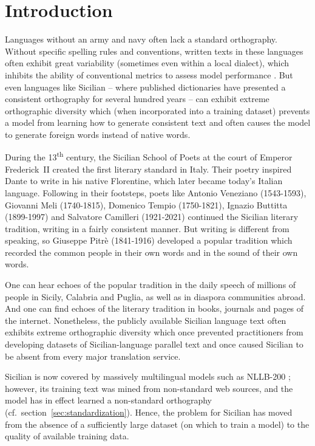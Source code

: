 \documentclass[11pt,a4paper]{article}
\begin{document}
\section{Introduction}
Languages without an army and navy often lack a standard orthography.
Without specific spelling rules and conventions, written texts in these languages
often exhibit great variability (sometimes even within a local dialect),
which inhibits the ability of conventional metrics to assess model performance
\citep{aepli2023benchmark}.
But even languages like Sicilian -- where published dictionaries have presented
a consistent orthography for several hundred years
\citep{pasqualino1785,mortillaro1876,nicotra1883,traina1868} --
can exhibit extreme orthographic diversity which
(when incorporated into a training dataset)
prevents a model from learning how to generate consistent text
and often causes the model to
generate foreign words instead of native words.

During the 13\textsuperscript{th} century,
the Sicilian School of Poets at the court of Emperor Frederick~II
created the first literary standard in Italy.  Their poetry
inspired Dante to write in his native Florentine, which later
became today's Italian language.
Following in their footsteps, poets like
Antonio Veneziano (1543-1593),
Giovanni Meli (1740-1815),
Domenico Tempio (1750-1821),
Ignazio Buttitta (1899-1997) and
Salvatore Camilleri (1921-2021)
continued the Sicilian literary tradition,
writing in a fairly consistent manner.
But writing is different from speaking, so
Giuseppe Pitrè (1841-1916)
developed a popular tradition which
recorded the common people
in their own words and in the sound of their own words.

One can hear echoes of the popular tradition in the daily speech
of millions of people in Sicily, Calabria and Puglia,
as well as in diaspora communities abroad.
And one can find echoes of the literary tradition in books,
journals and pages of the internet.
Nonetheless, the publicly available Sicilian language text
often exhibits extreme orthographic diversity which
once prevented practitioners from developing
datasets of Sicilian-language parallel text and once
caused Sicilian to be absent from every major translation service.

Sicilian is now covered by massively multilingual models such as NLLB-200 \citep{nllb2022};
however, its training text was mined from non-standard web sources, and the model has in effect
learned a non-standard orthography (cf.\ section~\ref{sec:standardization}).
Hence, the problem for Sicilian has moved from the absence of a sufficiently large dataset
(on which to train a model) to the quality of available training data.
\end{document}
